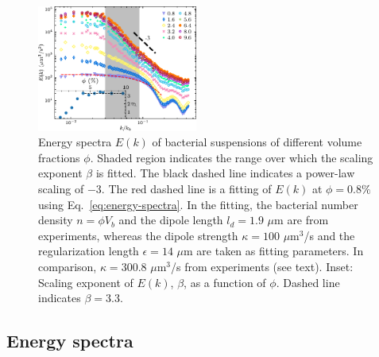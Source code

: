 \documentclass[twocolumn,aps,prx,amsmath,amssymb,longbibliography,superscriptaddress]{revtex4-2}
\begin{document}
\begin{figure}[t]
\begin{center}\includegraphics[width=0.47\textwidth]{Figures/fig-4.pdf}
\caption[Concentration dependence of energy spectra.]
{
Energy spectra $E(k)$ of bacterial suspensions of different volume fractions $\phi$. Shaded region indicates the range over which the scaling exponent $\beta$ is fitted. The black dashed line indicates a power-law scaling of $-3$. The red dashed line is a fitting of $E(k)$ at $\phi=0.8\%$ using Eq.~\ref{eq:energy-spectra}. In the fitting, the bacterial number density $n=\phi V_b$ and the dipole length $l_d = 1.9$ $\mu$m are from experiments, whereas the dipole strength $\kappa = 100$ $\mu$m$^3$/s and the regularization length $\epsilon = 14$ $\mu$m are taken as fitting parameters. In comparison, $\kappa = 300.8$ $\mu$m$^3$/s from experiments (see text).
Inset: Scaling exponent of $E(k)$, $\beta$, as a function of $\phi$. Dashed line indicates $\beta = 3.3$.
}
\label{fig:energy-spectra}
\end{center}
\end{figure}

\subsection{Energy spectra}
\end{document}
